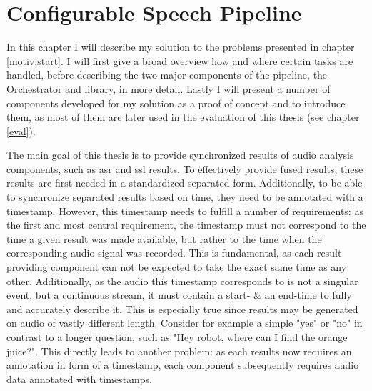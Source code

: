 \chapter{Configurable Speech Pipeline}
\label{main:main}
In this chapter I will describe my solution to the problems presented in chapter \ref{motiv:start}.
I will first give a broad overview how and where certain tasks are handled, before describing the two major components of the pipeline, the Orchestrator and library, in more detail.
Lastly I will present a number of components developed for my solution as a proof of concept and to introduce them, as most of them are later used in the evaluation of this thesis (see chapter \ref{eval}).

The main goal of this thesis is to provide synchronized results of audio analysis components, such as \gls{asr} and \gls{ssl} results.
To effectively provide fused results, these results are first needed in a standardized separated form.
Additionally, to be able to synchronize separated results based on time, they need to be annotated with a timestamp.
However, this timestamp needs to fulfill a number of requirements:
as the first and most central requirement, the timestamp must not correspond to the time a given result was made available, but rather to the time when the corresponding audio signal was recorded.
This is fundamental, as each result providing component can not be expected to take the exact same time as any other.
Additionally, as the audio this timestamp corresponds to is not a singular event, but a continuous stream, it must contain a start- \& an end-time to fully and accurately describe it.
This is especially true since results may be generated on audio of vastly different length.
Consider for example a simple "yes" or "no" in contrast to a longer question, such as "Hey robot, where can I find the orange juice?".
This directly leads to another problem:
as each results now requires an annotation in form of a timestamp, each component subsequently requires audio data annotated with timestamps.

